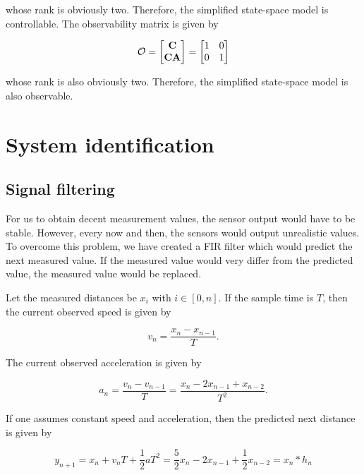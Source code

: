 \documentclass[11pt,titlepage]{report}
\begin{document}
whose rank is obviously two. Therefore, the simplified state-space model is controllable. The observability matrix is given by

\begin{equation}
	\mathcal{O} = \begin{bmatrix}
		\mathbf{C} \\
		\mathbf{C} \mathbf{A}
	\end{bmatrix} = \begin{bmatrix}
		1 & 0 \\
		0 & 1
	\end{bmatrix}
\end{equation}

whose rank is also obviously two. Therefore, the simplified state-space model is also observable.

\section{System identification}
\subsection{Signal filtering}
For us to obtain decent measurement values, the sensor output would have to be stable. However, every now and then, the sensors would output unrealistic values. To overcome this problem, we have created a FIR filter which would predict the next measured value. If the measured value would very differ from the predicted value, the measured value would be replaced.

Let the measured distances be $x_i$ with $i \in [0,n]$. If the sample time is $T$, then the current observed speed is given by

\begin{equation}
	v_n = \frac{x_{n} - x_{n-1}}{T}.
\end{equation}

The current observed acceleration is given by

\begin{equation}
	a_n = \frac{v_n - v_{n-1}}{T} = \frac{x_{n} - 2 x_{n-1} + x_{n-2}}{T^2}.
\end{equation}

If one assumes constant speed and acceleration, then the predicted next distance is given by

\begin{equation}
	y_{n+1} = x_{n} + v_n T + \frac{1}{2} a T^2 = \frac{5}{2} x_n - 2 x_{n-1} + \frac{1}{2} x_{n-2}= x_n \ast h_n
\end{equation}
\end{document}
